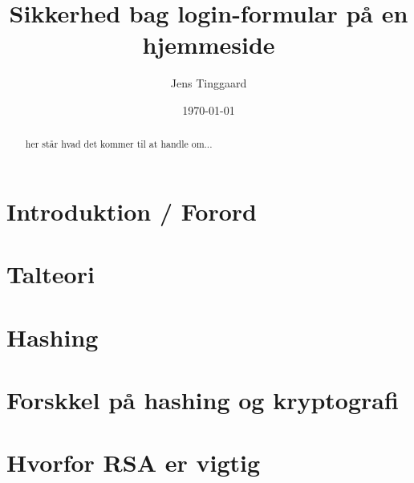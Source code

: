 \documentclass[a4paper, 12pt]{article}
\date{\today}
\title{Sikkerhed bag login-formular på en hjemmeside}
\author{Jens Tinggaard}
\theoremstyle{break}
\theoremstyle{breakline}
\begin{document}
\clearpage\maketitle
\thispagestyle{empty}
\maketitle

\begin{abstract} %
her står hvad det kommer til at handle om...
\end{abstract}



\newpage
\tableofcontents


\newpage
\section*{Introduktion / Forord}



\newpage
\section{Talteori}



\newpage
\section{Hashing}



\newpage
\section{Forskkel på hashing og kryptografi}



\newpage
\section{Hvorfor RSA er vigtig}





\newpage
\setlength\bibitemsep{10pt}
\printbibliography[
heading=bibintoc, %
title={Litteratur} %
]
\end{document}
